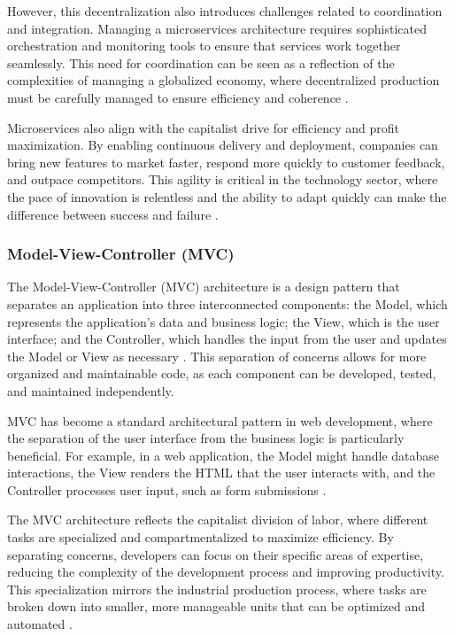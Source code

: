 \begin{refsection}
However, this decentralization also introduces challenges related to coordination and integration. Managing a microservices architecture requires sophisticated orchestration and monitoring tools to ensure that services work together seamlessly. This need for coordination can be seen as a reflection of the complexities of managing a globalized economy, where decentralized production must be carefully managed to ensure efficiency and coherence \cite[pp.~150-152]{Gamma2015}.

Microservices also align with the capitalist drive for efficiency and profit maximization. By enabling continuous delivery and deployment, companies can bring new features to market faster, respond more quickly to customer feedback, and outpace competitors. This agility is critical in the technology sector, where the pace of innovation is relentless and the ability to adapt quickly can make the difference between success and failure \cite[pp.~83-85]{Bass2021}.

\subsubsection{Model-View-Controller (MVC)}

The Model-View-Controller (MVC) architecture is a design pattern that separates an application into three interconnected components: the Model, which represents the application's data and business logic; the View, which is the user interface; and the Controller, which handles the input from the user and updates the Model or View as necessary \cite[pp.~90-92]{Gamma2015}. This separation of concerns allows for more organized and maintainable code, as each component can be developed, tested, and maintained independently.

MVC has become a standard architectural pattern in web development, where the separation of the user interface from the business logic is particularly beneficial. For example, in a web application, the Model might handle database interactions, the View renders the HTML that the user interacts with, and the Controller processes user input, such as form submissions \cite[pp.~130-133]{Buschmann2007}.

The MVC architecture reflects the capitalist division of labor, where different tasks are specialized and compartmentalized to maximize efficiency. By separating concerns, developers can focus on their specific areas of expertise, reducing the complexity of the development process and improving productivity. This specialization mirrors the industrial production process, where tasks are broken down into smaller, more manageable units that can be optimized and automated \cite[pp.~58-60]{Bass2021}.


\end{refsection}

